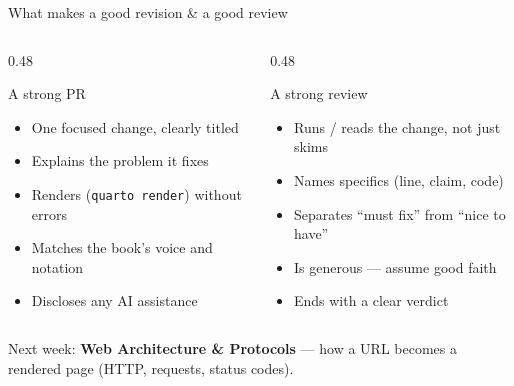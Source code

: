 \documentclass[9pt,aspectratio=169]{beamer}
\begin{document}
\begin{frame}{What makes a good revision \& a good review}
    \begin{columns}[T]
        \begin{column}{0.48\textwidth}
            \begin{block}{A strong PR}
                \begin{itemize}\small
                    \item One focused change, clearly titled
                    \item Explains the problem it fixes
                    \item Renders (\texttt{quarto render}) without errors
                    \item Matches the book's voice and notation
                    \item Discloses any AI assistance
                \end{itemize}
            \end{block}
        \end{column}
        \begin{column}{0.48\textwidth}
            \begin{block}{A strong review}
                \begin{itemize}\small
                    \item Runs / reads the change, not just skims
                    \item Names specifics (line, claim, code)
                    \item Separates ``must fix'' from ``nice to have''
                    \item Is generous --- assume good faith
                    \item Ends with a clear verdict
                \end{itemize}
            \end{block}
        \end{column}
    \end{columns}
    \vspace{0.5em}
    \centering\small Next week: \textbf{Web Architecture \& Protocols} --- how a URL becomes a rendered page (HTTP, requests, status codes).
\end{frame}
\end{document}
